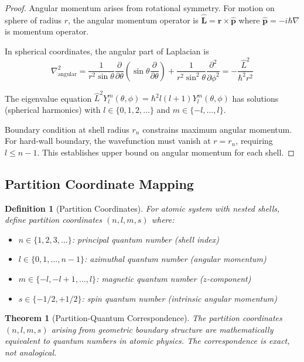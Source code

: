 \documentclass[twocolumn,10pt]{article}
\newtheorem{theorem}{Theorem}[section]
\newtheorem{definition}{Definition}[section]
\begin{document}
\begin{proof}
Angular momentum arises from rotational symmetry. For motion on sphere of radius $r$, the angular momentum operator is $\hat{\mathbf{L}} = \mathbf{r} \times \hat{\mathbf{p}}$ where $\hat{\mathbf{p}} = -i\hbar\nabla$ is momentum operator.

In spherical coordinates, the angular part of Laplacian is
\begin{equation}
\nabla^2_{\text{angular}} = \frac{1}{r^2\sin\theta}\frac{\partial}{\partial\theta}\left(\sin\theta\frac{\partial}{\partial\theta}\right) + \frac{1}{r^2\sin^2\theta}\frac{\partial^2}{\partial\phi^2} = -\frac{\hat{L}^2}{\hbar^2 r^2}
\end{equation}

The eigenvalue equation $\hat{L}^2 Y_l^m(\theta,\phi) = \hbar^2 l(l+1) Y_l^m(\theta,\phi)$ has solutions (spherical harmonics) with $l \in \{0, 1, 2, \ldots\}$ and $m \in \{-l, \ldots, l\}$.

Boundary condition at shell radius $r_n$ constrains maximum angular momentum. For hard-wall boundary, the wavefunction must vanish at $r = r_n$, requiring $l \leq n-1$. This establishes upper bound on angular momentum for each shell.
\end{proof}

\subsection{Partition Coordinate Mapping}

\begin{definition}[Partition Coordinates]
For atomic system with nested shells, define partition coordinates $(n, l, m, s)$ where:
\begin{itemize}
\item $n \in \{1, 2, 3, \ldots\}$: principal quantum number (shell index)
\item $l \in \{0, 1, \ldots, n-1\}$: azimuthal quantum number (angular momentum)
\item $m \in \{-l, -l+1, \ldots, l\}$: magnetic quantum number ($z$-component)
\item $s \in \{-1/2, +1/2\}$: spin quantum number (intrinsic angular momentum)
\end{itemize}
\end{definition}

\begin{theorem}[Partition-Quantum Correspondence]
\label{thm:partition_quantum}
The partition coordinates $(n, l, m, s)$ arising from geometric boundary structure are mathematically equivalent to quantum numbers in atomic physics. The correspondence is exact, not analogical.
\end{theorem}
\end{document}
